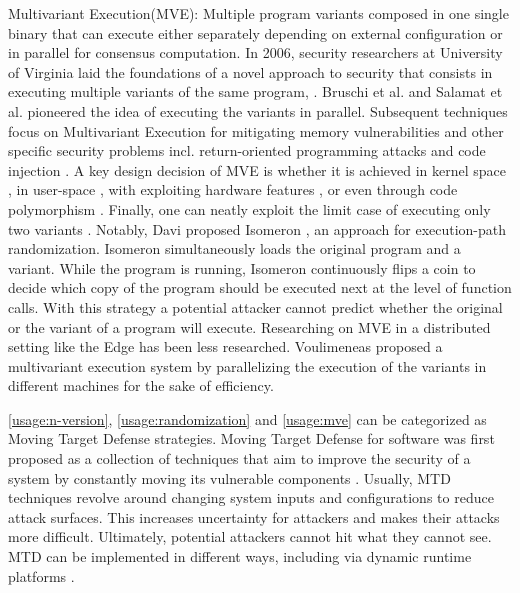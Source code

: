 \begin{usage}{Multivariant Execution(MVE):}
    \label{usage:mve}
    \normalfont
    Multiple program variants composed in one single binary that can execute either separately depending on external configuration or in parallel for consensus computation. In 2006, security researchers at University of Virginia laid the foundations of a novel approach to security that consists in executing multiple variants of the same program, \cite{cox06}. Bruschi et al. \cite{bruschi2007diversified} and Salamat et al. \cite{salamat2007stopping} pioneered the idea of executing the variants in parallel. Subsequent techniques focus on Multivariant Execution for mitigating memory vulnerabilities \cite{lu2018stopping} and other specific security problems incl. return-oriented programming attacks \cite{volckaert2015cloning} and code injection \cite{SalamatJWWF11}. A key design decision of MVE is whether it is achieved in kernel space \cite{osterlund2019kmvx}, in user-space \cite{salamat2009orchestra}, with exploiting hardware features \cite{koning2016secure}, or even through code polymorphism \cite{10.1145/3281662}. Finally, one can neatly exploit the limit case of executing only two variants \cite{maurer2012tachyon,Kim2015}. Notably,  Davi \etal proposed Isomeron \cite{davi2015isomeron}, an approach  for execution-path randomization. Isomeron simultaneously loads the original program and a variant. While the program is running, Isomeron continuously flips a coin to decide which copy of the program should be executed next at the level of function calls. With this strategy a potential attacker cannot predict whether the original or the variant of a program will execute.
    Researching on MVE in a distributed setting like the Edge \citationneeded has been less researched. Voulimeneas \etal proposed a multivariant execution system by parallelizing the execution of the variants in different machines \cite{voulimeneas2021dmvx} for the sake of efficiency. 
    
\end{usage}


\autoref{usage:n-version}, \autoref{usage:randomization} and \autoref{usage:mve} can be categorized as Moving Target Defense strategies. Moving Target Defense for software was first proposed as a collection of techniques that aim to improve the security of a system by constantly moving its vulnerable components \cite{MTDNationalCyberLaep, okhravi2013survey}. Usually, MTD techniques revolve around changing system inputs and configurations to reduce attack surfaces. 
This increases uncertainty for attackers and makes their attacks more difficult.  Ultimately, potential attackers cannot hit what they cannot see. 
MTD can be implemented in different ways, including via dynamic runtime platforms \cite{10.1145/3318216.3363338}. 




